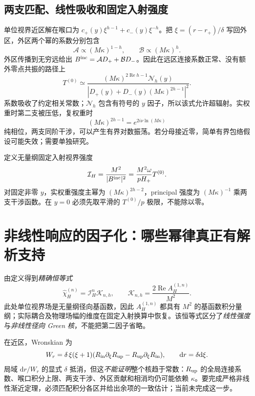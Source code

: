 \documentclass[UTF8,fontset=fandol,11pt,a4paper,oneside]{ctexart}
\numberwithin{equation}{section}
\newcommand{\dd}{\mathrm d}
\newcommand{\Ree}{\operatorname{Re}}
\begin{document}
\subsection{两支匹配、线性吸收和固定入射强度}
单位视界近区解在喉口为 $c_+(y)\xi^{h-1}+c_-(y)\xi^{-h}$。把 $\xi=(r-r_+)/\delta$ 写回外区，外区两个幂的系数分别包含
\begin{equation}
 \mathcal A\propto(M\kappa)^{1-h},\qquad
 \mathcal B\propto(M\kappa)^h.
\end{equation}
外区传播到无穷远给出 $B^{\rm inc}=\mathcal A D_++\mathcal B D_-$。因此在远区连接系数正常、没有额外零点共振的路径上
\begin{equation}
 T^{(0)}\simeq
 \frac{(M\kappa)^{2\Ree h-1}\mathcal N_h(y)}
 {|D_+(y)+D_-(y)(M\kappa)^{2h-1}|^2}.
\label{eq:new-matched-t0}
\end{equation}
系数吸收了约定相关常数；$\mathcal N_h$ 包含有符号的 $y$ 因子，所以该式允许超辐射。实权重时第二支被压低，复权重时
\begin{equation}
 (M\kappa)^{2h-1}=e^{2i\nu\ln(M\kappa)}
\end{equation}
纯相位，两支同阶干涉，可以产生有界对数振荡。若分母接近零，简单有界包络假设可能失效；需要单独研究。

定义无量纲固定入射视界强度
\begin{equation}
 \mathcal I_H=\frac{M^2}{|B^{\rm inc}|^2}
 =\frac{M^2\omega}{pH_+}T^{(0)}.
\end{equation}
对固定非零 $y$，实权重强度主幂为 $(M\kappa)^{2h-2}$，principal 强度为 $(M\kappa)^{-1}$ 乘两支干涉函数。在 $y=0$ 必须先取平滑的 $T^{(0)}/p$ 极限，不能除以零。

\section{非线性响应的因子化：哪些幂律真正有解析支持}
由定义得到\emph{精确恒等式}
\begin{equation}
 \boxed{\widehat\chi_H^{(n)}=\mathcal I_H^n\mathcal K_{n,h},\qquad
 \mathcal K_{n,h}=\frac{2\Ree A_H^{(1,n)}}{M^2}.}
\label{eq:new-factorization}
\end{equation}
此处单位视界场是无量纲径向基函数，因此 $A_H^{(1,\allowbreak n)}$ 都具有 $M^2$ 的基函数积分量纲；实际耦合及物理场幅的维度在固定入射换算中恢复。该恒等式区分了\emph{线性强度}与\emph{非线性径向 Green 核}，不能把第二因子省略。

在近区，Wronskian 为
\begin{equation}
 W_r=\delta\,\xi(\xi+1)
 (R_{\rm in}\partial_\xi R_{\rm up}-R_{\rm up}\partial_\xi R_{\rm in}),
 \qquad\dd r=\delta\dd\xi.
\end{equation}
局域 $\dd r/W_r$ 的显式 $\delta$ 抵消，但这\emph{不能证明}整个核趋于常数：$R_{\rm up}$ 的全局连接系数、喉口积分上限、两支干涉、外区贡献和相消均仍可能依赖 $\kappa$。要完成严格非线性渐近定理，必须匹配积分各区并给出余项的一致估计；当前未完成这一步。
\end{document}

